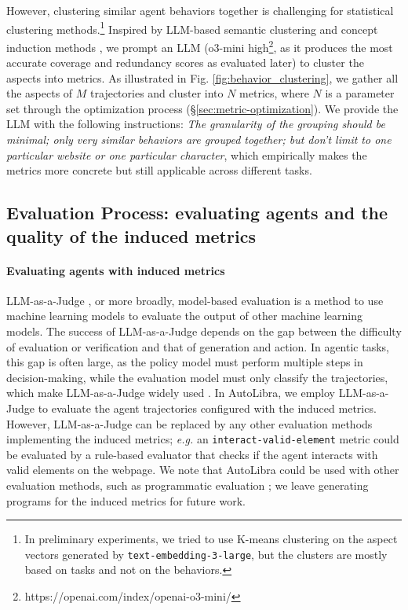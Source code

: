 However, clustering similar agent behaviors together is challenging for statistical clustering methods.\footnote{
    In preliminary experiments, we tried to use K-means clustering on the aspect vectors generated by \texttt{text-embedding-3-large},
    but the clusters are mostly based on tasks and not on the behaviors.
}
Inspired by LLM-based semantic clustering and concept induction methods \citet{viswanathan2024large,lam2024concept}, we prompt an LLM (o3-mini high\footnote{https://openai.com/index/openai-o3-mini/}, as it produces the most accurate coverage and redundancy scores as evaluated later) 
to cluster the aspects into metrics. 
As illustrated in Fig. \ref{fig:behavior_clustering},
we gather all the aspects of $M$ trajectories
and cluster into $N$ metrics, where $N$ is a parameter set through the optimization process (\S\ref{sec:metric-optimization}).
We provide the LLM with the following instructions:
\emph{The granularity of the grouping should be minimal; only very similar behaviors are grouped together; but don't limit to one particular website or one particular character}, which empirically
makes the metrics more concrete but still applicable across different tasks.


\subsection{Evaluation Process: evaluating agents and the quality of the induced metrics}
\label{sec:evaluation_process}

\paragraph{Evaluating agents with induced metrics}
LLM-as-a-Judge \citep{zheng2023judging},
or more broadly, model-based evaluation
\citep{zhang2019bertscore,celikyilmaz2021evaluationtextgenerationsurvey}
is a method to use machine learning models to evaluate the output of other machine learning models.
The success of LLM-as-a-Judge depends on the gap between the difficulty of evaluation or verification and
that of generation and action. 
In agentic tasks, this gap is often large, as the policy model must perform multiple steps in decision-making, while the evaluation model must only
classify the trajectories, which make LLM-as-a-Judge widely used \citep{zhouwebarena,he2024webvoyager,zhousotopia}.
In AutoLibra, we employ LLM-as-a-Judge to
evaluate the agent trajectories configured with the induced metrics. However, LLM-as-a-Judge
can be replaced by any other evaluation methods implementing the induced metrics;
\emph{e.g.} an \texttt{interact-valid-element} metric
could be evaluated by a rule-based evaluator that checks if the agent
interacts with valid elements on the webpage. We note that AutoLibra could be used with other evaluation methods, such as
programmatic evaluation \citep{maeureka}; we leave generating programs for the induced metrics for future work.

